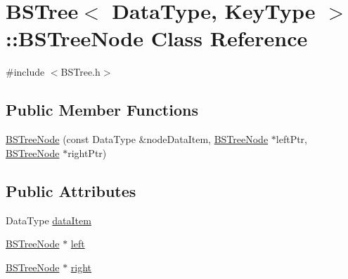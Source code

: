\hypertarget{class_b_s_tree_1_1_b_s_tree_node}{\section{B\-S\-Tree$<$ Data\-Type, Key\-Type $>$\-:\-:B\-S\-Tree\-Node Class Reference}
\label{class_b_s_tree_1_1_b_s_tree_node}
}


{\ttfamily \#include $<$B\-S\-Tree.\-h$>$}

\subsection*{Public Member Functions}
\begin{DoxyCompactItemize}
\item 
\hyperlink{class_b_s_tree_1_1_b_s_tree_node_a40f0e1ccea243f6d47b5c1b0a2913ff8}{B\-S\-Tree\-Node} (const Data\-Type \&node\-Data\-Item, \hyperlink{class_b_s_tree_1_1_b_s_tree_node}{B\-S\-Tree\-Node} $\ast$left\-Ptr, \hyperlink{class_b_s_tree_1_1_b_s_tree_node}{B\-S\-Tree\-Node} $\ast$right\-Ptr)
\end{DoxyCompactItemize}
\subsection*{Public Attributes}
\begin{DoxyCompactItemize}
\item 
Data\-Type \hyperlink{class_b_s_tree_1_1_b_s_tree_node_a507c8d6dde1b8d35d9af6b4e78f38962}{data\-Item}
\item 
\hyperlink{class_b_s_tree_1_1_b_s_tree_node}{B\-S\-Tree\-Node} $\ast$ \hyperlink{class_b_s_tree_1_1_b_s_tree_node_a7a90150dd249432e240dc363955c5ca1}{left}
\item 
\hyperlink{class_b_s_tree_1_1_b_s_tree_node}{B\-S\-Tree\-Node} $\ast$ \hyperlink{class_b_s_tree_1_1_b_s_tree_node_a8d7bfd0208a562c8b8ab332e1d796563}{right}
\end{DoxyCompactItemize}


